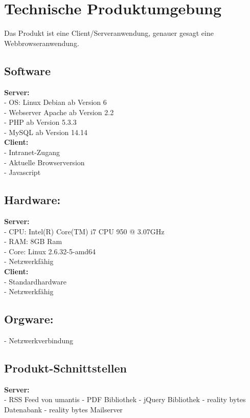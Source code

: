 \section{Technische Produktumgebung}

    Das Produkt ist eine Client/Serveranwendung, genauer gesagt eine Webbrowseranwendung.

    \subsection{Software}

        \textbf{Server:} \\
        - OS: Linux Debian ab Version 6 \\
        - Webserver Apache ab Version 2.2 \\
        - PHP ab Version 5.3.3 \\
        - MySQL ab Version 14.14 \\

        \textbf{Client:} \\
        - Intranet-Zugang \\
        - Aktuelle Browserversion \\
        - Javascript

    \subsection{Hardware:}

        \textbf{Server:} \\
        - CPU: Intel(R) Core(TM) i7 CPU 950 @ 3.07GHz \\
        - RAM: 8GB Ram \\
        - Core: Linux 2.6.32-5-amd64 \\
        - Netzwerkfähig \\

        \textbf{Client:} \\
        - Standardhardware \\
        - Netzwerkfähig

    \subsection{Orgware:}

        - Netzwerkverbindung

    \subsection{Produkt-Schnittstellen}

        \textbf{Server:} \\
        - RSS Feed von umantis
        - PDF Bibliothek
        - jQuery Bibliothek
        - reality bytes Datenabank
        - reality bytes Mailserver
